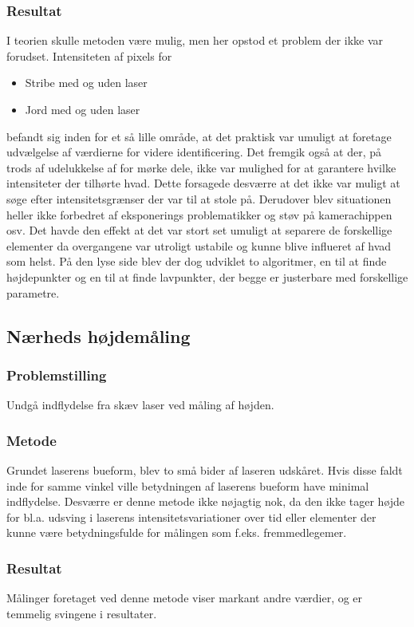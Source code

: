 \subsubsection{Resultat}
I teorien skulle metoden være mulig, men her opstod et problem der ikke var forudset. Intensiteten af pixels for
\begin{itemize}
	\item Stribe med og uden laser
	\item Jord med og uden laser
\end{itemize}
befandt sig inden for et så lille område, at det praktisk var umuligt at foretage udvælgelse af værdierne for videre identificering. Det fremgik også at der, på trods af udelukkelse af for mørke dele, ikke var mulighed for at garantere hvilke intensiteter der tilhørte hvad. Dette forsagede desværre at det ikke var muligt at søge efter intensitetsgrænser der var til at stole på.
Derudover blev situationen heller ikke forbedret af eksponerings problematikker og støv på kamerachippen osv.
Det havde den effekt at det var stort set umuligt at separere de forskellige elementer da overgangene var utroligt ustabile og kunne blive influeret af hvad som helst. På den lyse side blev der dog udviklet to algoritmer, en til at finde højdepunkter og en til at finde lavpunkter, der begge er justerbare med forskellige parametre.
\newpage
\subsection{Nærheds højdemåling}
\subsubsection{Problemstilling}
Undgå indflydelse fra skæv laser ved måling af højden.

\subsubsection{Metode}
Grundet laserens bueform, blev to små bider af laseren udskåret. Hvis disse faldt inde for samme vinkel ville betydningen af laserens bueform have minimal indflydelse. Desværre er denne metode ikke nøjagtig nok, da den ikke tager højde for bl.a. udsving i laserens intensitetsvariationer over tid eller elementer der kunne være betydningsfulde for målingen som f.eks. fremmedlegemer.

\subsubsection{Resultat}
Målinger foretaget ved denne metode viser markant andre værdier, og er temmelig svingene i resultater.
